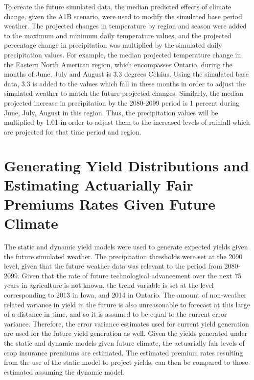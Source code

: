 To create the future simulated data, the median predicted effects of climate change, given the A1B scenario, were used to modify the simulated base period weather. The projected changes in temperature by region and season were added to the maximum and minimum daily temperature values, and the projected percentage change in precipitation was multiplied by the simulated daily precipitation values. For example, the median projected temperature change in the Eastern North American region, which encompasses Ontario, during the months of June, July and August is 3.3 degrees Celsius. Using the simulated base data, 3.3 is added to the values which fall in these months in order to adjust the simulated weather to match the future projected changes. Similarly, the median projected increase in precipitation by the 2080-2099 period is 1 percent during June, July, August in this region. Thus, the precipitation values will be multiplied by 1.01 in order to adjust them to the increased levels of rainfall which are projected for that time period and region.

\section{Generating Yield Distributions and Estimating Actuarially Fair Premiums Rates Given Future Climate}

The static and dynamic yield models were used to generate expected yields given the future simulated weather. The precipitation thresholds were set at the 2090 level, given that the future weather data was relevant to the period from 2080-2099. Given that the rate of future technological advancement over the next 75 years in agriculture is not known, the trend variable is set at the level corresponding to 2013 in Iowa, and 2014 in Ontario. The amount of non-weather related variance in yield in the future is also unreasonable to forecast at this large of a distance in time, and so it is assumed to be equal to the current error variance. Therefore, the error variance estimates used for current yield generation are used for the future yield generation as well. Given the yields generated under the static and dynamic models given future climate, the actuarially fair levels of crop insurance premiums are estimated. The estimated premium rates resulting from the use of the static model to project yields, can then be compared to those estimated assuming the dynamic model. 

